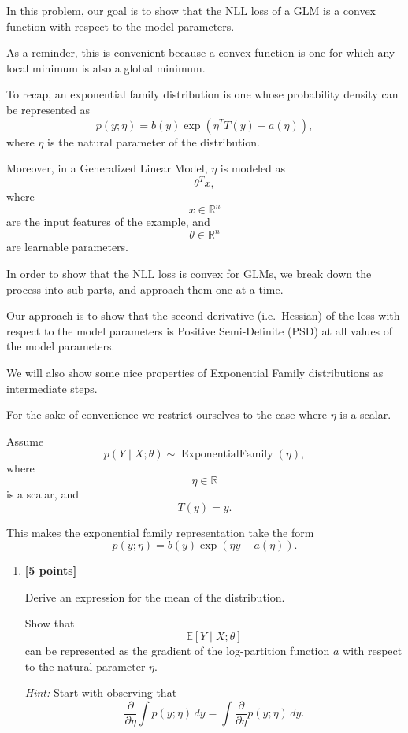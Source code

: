 \documentclass[10pt]{article}
\begin{document}
\begin{enumerate}
In this problem, our goal is to show that the NLL loss of a GLM is a
convex function with respect to the model parameters.

As a reminder, this is convenient because a convex function is one
for which any local minimum is also a global minimum.

To recap, an exponential family distribution is one whose probability
density can be represented as
\[
p(y;\eta)
=
b(y)
\exp\left(
\eta^TT(y)-a(\eta)
\right),
\]
where $\eta$ is the natural parameter of the distribution.

Moreover, in a Generalized Linear Model, $\eta$ is modeled as
\[
\theta^Tx,
\]
where
\[
x\in\mathbb{R}^n
\]
are the input features of the example, and
\[
\theta\in\mathbb{R}^n
\]
are learnable parameters.

In order to show that the NLL loss is convex for GLMs, we break down
the process into sub-parts, and approach them one at a time.

Our approach is to show that the second derivative (i.e.\ Hessian) of
the loss with respect to the model parameters is Positive
Semi-Definite (PSD) at all values of the model parameters.

We will also show some nice properties of Exponential Family
distributions as intermediate steps.

For the sake of convenience we restrict ourselves to the case where
$\eta$ is a scalar.

Assume
\[
p(Y\mid X;\theta)
\sim
\operatorname{ExponentialFamily}(\eta),
\]
where
\[
\eta\in\mathbb{R}
\]
is a scalar, and
\[
T(y)=y.
\]

This makes the exponential family representation take the form
\[
p(y;\eta)
=
b(y)\exp(\eta y-a(\eta)).
\]

\begin{enumerate}[label=(\alph*)]


\item \textbf{[5 points]}

Derive an expression for the mean of the distribution.

Show that
\[
\mathbb{E}[Y\mid X;\theta]
\]
can be represented as the gradient of the log-partition function
$a$ with respect to the natural parameter $\eta$.

\textit{Hint:}
Start with observing that
\[
\frac{\partial}{\partial\eta}
\int p(y;\eta)\,dy
=
\int
\frac{\partial}{\partial\eta}
p(y;\eta)\,dy.
\]


\end{enumerate}
\end{enumerate}
\end{document}
